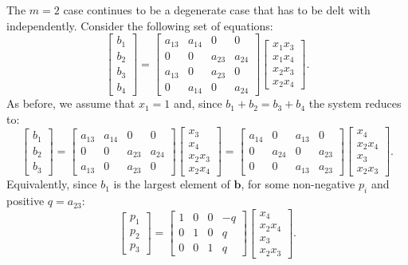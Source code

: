 The $m=2$ case continues to be a degenerate case that has to be delt with independently. Consider the following set of equations:
$$
\left[\begin{matrix}
b_1 \\ b_2 \\ b_3 \\ b_4
\end{matrix}\right] =
\left[\begin{matrix}
a_{13} & a_{14} & 0 & 0 \\
0 & 0 & a_{23} & a_{24} \\
a_{13} & 0 & a_{23} & 0 \\
0 & a_{14} & 0 & a_{24}
\end{matrix}\right]
\left[\begin{matrix}
x_1x_3 \\ x_1x_4 \\ x_2x_3 \\ x_2x_4
\end{matrix}\right].
$$
As before, we assume that $x_1=1$ and, since $b_1+b_2=b_3+b_4$ the system reduces to: 
$$
\left[\begin{matrix}
b_1 \\ b_2 \\ b_3
\end{matrix}\right] =
\left[\begin{matrix}
a_{13} & a_{14} & 0 & 0 \\
0 & 0 & a_{23} & a_{24} \\
a_{13} & 0 & a_{23} & 0
\end{matrix}\right]
\left[\begin{matrix}
x_3 \\ x_4 \\ x_2x_3 \\ x_2x_4
\end{matrix}\right] =
\left[\begin{matrix}
a_{14} & 0 & a_{13} & 0 \\
0 & a_{24} & 0 & a_{23} \\
0 & 0 & a_{13} & a_{23} 
\end{matrix}\right]
\left[\begin{matrix}
x_4  \\ x_2x_4 \\ x_3 \\ x_2x_3
\end{matrix}\right]
.
$$
Equivalently, since $b_1$ is the largest element of $\mathbf{b}$, for some non-negative $p_i$ and positive $q=a_{23}$: 
$$
\left[\begin{matrix}
p_1 \\ p_2 \\ p_3
\end{matrix}\right] =
\left[\begin{matrix}
1 & 0 & 0 & -q \\
0 & 1 & 0 & q \\
0 & 0 & 1 & q
\end{matrix}\right]
\left[\begin{matrix}
x_4  \\ x_2x_4 \\ x_3 \\ x_2x_3
\end{matrix}\right].
$$
